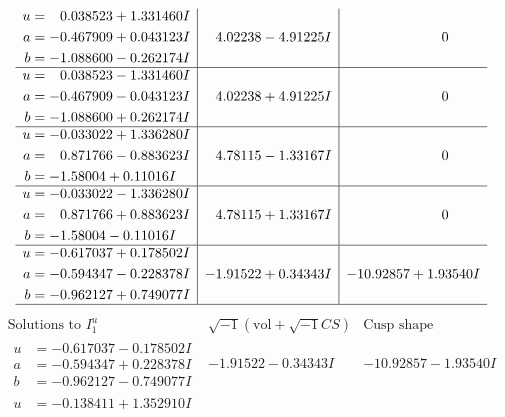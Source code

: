 \documentclass[1p]{elsarticle_modified}
\theoremstyle{definition}
\newcommand{\I}{\sqrt{-1}}
\begin{document}
$$\begin{array}{c|c|c}
\begin{aligned}
u &= \phantom{-}0.038523 + 1.331460 I \\
a &= -0.467909 + 0.043123 I \\
b &= -1.088600 - 0.262174 I\end{aligned}
 & \phantom{-}4.02238 - 4.91225 I & \phantom{-0.000000 } 0 \\ \hline\begin{aligned}
u &= \phantom{-}0.038523 - 1.331460 I \\
a &= -0.467909 - 0.043123 I \\
b &= -1.088600 + 0.262174 I\end{aligned}
 & \phantom{-}4.02238 + 4.91225 I & \phantom{-0.000000 } 0 \\ \hline\begin{aligned}
u &= -0.033022 + 1.336280 I \\
a &= \phantom{-}0.871766 - 0.883623 I \\
b &= -1.58004 + 0.11016 I\end{aligned}
 & \phantom{-}4.78115 - 1.33167 I & \phantom{-0.000000 } 0 \\ \hline\begin{aligned}
u &= -0.033022 - 1.336280 I \\
a &= \phantom{-}0.871766 + 0.883623 I \\
b &= -1.58004 - 0.11016 I\end{aligned}
 & \phantom{-}4.78115 + 1.33167 I & \phantom{-0.000000 } 0 \\ \hline\begin{aligned}
u &= -0.617037 + 0.178502 I \\
a &= -0.594347 - 0.228378 I \\
b &= -0.962127 + 0.749077 I\end{aligned}
 & -1.91522 + 0.34343 I & -10.92857 + 1.93540 I\\
 \hline 
 \end{array}$$\newpage$$\begin{array}{c|c|c}  
\text{Solutions to }I^u_{1}& \I (\text{vol} + \sqrt{-1}CS) & \text{Cusp shape}\\
 \hline 
\begin{aligned}
u &= -0.617037 - 0.178502 I \\
a &= -0.594347 + 0.228378 I \\
b &= -0.962127 - 0.749077 I\end{aligned}
 & -1.91522 - 0.34343 I & -10.92857 - 1.93540 I \\ \hline\begin{aligned}
u &= -0.138411 + 1.352910 I \\

\end{aligned}
\end{array}$$
\end{document}
